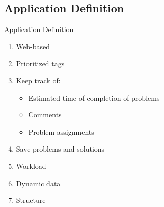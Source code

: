 \subsection*{Application Definition}
\begin{frame}{Application Definition}
\begin{enumerate}
\item Web-based
\item Prioritized tags
\item Keep track of:
	\begin{itemize}
		\item Estimated time of completion of problems
		\item Comments
		\item Problem assignments
	\end{itemize}
\item Save problems and solutions
\item Workload
\item Dynamic data
\item Structure
\end{enumerate}
\end{frame}

